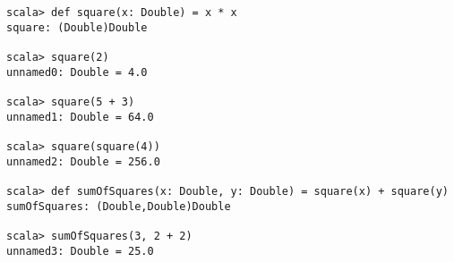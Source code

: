  



\begin{lstlisting}
scala> def square(x: Double) = x * x
square: (Double)Double

scala> square(2)
unnamed0: Double = 4.0

scala> square(5 + 3)
unnamed1: Double = 64.0

scala> square(square(4))
unnamed2: Double = 256.0

scala> def sumOfSquares(x: Double, y: Double) = square(x) + square(y)
sumOfSquares: (Double,Double)Double

scala> sumOfSquares(3, 2 + 2)
unnamed3: Double = 25.0
\end{lstlisting}

